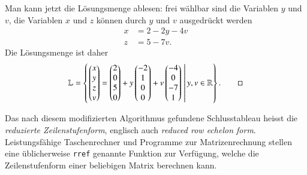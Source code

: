 \begin{beispiel}
Man kann jetzt die Lösungsmenge ablesen: frei wählbar sind die Variablen 
$y$ und $v$, die Variablen $x$ und $z$ können durch $y$ und $v$ ausgedrückt
werden
\begin{align*}
x&=2-2y-4v\\
z&=5-7v.
\end{align*}
Die Lösungsmenge ist daher
\[
{\mathbb L}
=
\left\{
\left.
\begin{pmatrix}x\\y\\z\\v\end{pmatrix}
=
\begin{pmatrix}2\\0\\5\\0\end{pmatrix}
+y\begin{pmatrix}-2\\1\\0\\0\end{pmatrix}
+v\begin{pmatrix}-4\\0\\-7\\1\end{pmatrix}\;\right|
y,v\in\mathbb R
\right\}.
\qedhere
\]
\end{beispiel}

Das nach diesem modifizierten Algorithmus gefundene Schlusstableau heisst
die {\em reduzierte Zeilenstufenform}, englisch auch {\em reduced row echelon form}.
Leistungsfähige Taschenrechner und Programme zur Matrizenrechnung stellen
eine üblicherweise \texttt{rref} genannte Funktion zur Verfügung, welche die 
Zeilenstufenform einer beliebigen Matrix berechnen kann.

